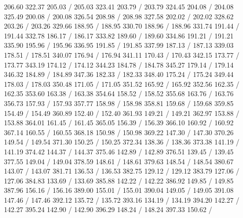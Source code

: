 { 206.60 322.37 205.03 /
 205.03 323.41 203.79 /
 203.79 324.45 204.08 /
 204.08 325.49 200.08 /
 200.08 326.54 208.98 /
 208.98 327.58 202.02 /
 202.02 328.62 203.26 /
 203.26 329.66 188.95 /
 188.95 330.70 188.96 /
 188.96 331.74 191.44 /
 191.44 332.78 186.17 /
 186.17 333.82 189.60 /
 189.60 334.86 191.21 /
 191.21 335.90 195.96 /
 195.96 336.95 191.85 /
 191.85 337.99 187.13 /
 187.13 339.03 178.51 /
 178.51 340.07 176.94 /
 176.94 341.11 170.43 /
 170.43 342.15 173.77 /
 173.77 343.19 174.12 /
 174.12 344.23 184.78 /
 184.78 345.27 179.14 /
 179.14 346.32 184.89 /
 184.89 347.36 182.33 /
 182.33 348.40 175.24 /
 175.24 349.44 178.03 /
 178.03 350.48 171.05 /
 171.05 351.52 165.92 /
 165.92 352.56 162.35 /
 162.35 353.60 163.38 /
 163.38 354.64 158.52 /
 158.52 355.68 163.76 /
 163.76 356.73 157.93 /
 157.93 357.77 158.98 /
 158.98 358.81 159.68 /
 159.68 359.85 154.49 /
 154.49 360.89 152.40 /
 152.40 361.93 149.21 /
 149.21 362.97 153.88 /
 153.88 364.01 161.45 /
 161.45 365.05 156.39 /
 156.39 366.10 160.92 /
 160.92 367.14 160.55 /
 160.55 368.18 150.98 /
 150.98 369.22 147.30 /
 147.30 370.26 149.54 /
 149.54 371.30 150.25 /
 150.25 372.34 138.36 /
 138.36 373.38 141.19 /
 141.19 374.42 144.37 /
 144.37 375.46 142.89 /
 142.89 376.51 139.45 /
 139.45 377.55 149.04 /
 149.04 378.59 148.61 /
 148.61 379.63 148.54 /
 148.54 380.67 143.07 /
 143.07 381.71 136.53 /
 136.53 382.75 129.12 /
 129.12 383.79 127.06 /
 127.06 384.83 133.69 /
 133.69 385.88 142.22 /
 142.22 386.92 149.85 /
 149.85 387.96 156.16 /
 156.16 389.00 155.01 /
 155.01 390.04 149.05 /
 149.05 391.08 147.46 /
 147.46 392.12 135.72 /
 135.72 393.16 134.19 /
 134.19 394.20 142.27 /
 142.27 395.24 142.90 /
 142.90 396.29 148.24 /
 148.24 397.33 150.62 /
}
